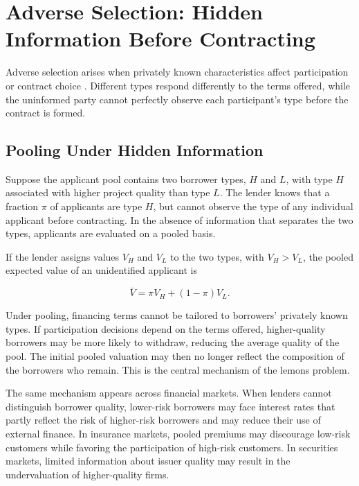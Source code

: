 \section{Adverse Selection: Hidden Information Before Contracting}

Adverse selection arises when privately known characteristics affect participation or contract choice \cite{Akerlof1970}. Different types respond differently to the terms offered, while the uninformed party cannot perfectly observe each participant's type before the contract is formed.

\subsection{Pooling Under Hidden Information} 

Suppose the applicant pool contains two borrower types, $H$ and $L$, with type $H$ associated with higher project quality than type $L$. The lender knows that a fraction $\pi$ of applicants are type $H$, but cannot observe the type of any individual applicant before contracting. In the absence of information that separates the two types, applicants are evaluated on a pooled basis.

If the lender assigns values $V_H$ and $V_L$ to the two types, with $V_H>V_L$, the pooled expected value of an unidentified applicant is

\begin{equation}
\bar V=\pi V_H+(1-\pi)V_L.
\label{eq:ch3-pooling-value}
\end{equation}

Under pooling, financing terms cannot be tailored to borrowers' privately known types. If participation decisions depend on the terms offered, higher-quality borrowers may be more likely to withdraw, reducing the average quality of the pool. The initial pooled valuation may then no longer reflect the composition of the borrowers who remain. This is the central mechanism of the lemons problem.

The same mechanism appears across financial markets. When lenders cannot distinguish borrower quality, lower-risk borrowers may face interest rates that partly reflect the risk of higher-risk borrowers and may reduce their use of external finance. In insurance markets, pooled premiums may discourage low-risk customers while favoring the participation of high-risk customers. In securities markets, limited information about issuer quality may result in the undervaluation of higher-quality firms.

